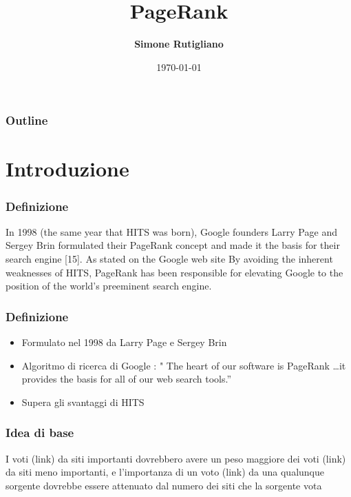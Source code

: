 \documentclass{beamer}
\title[PAGERANK]{PageRank}
\institute{
\begin{small}
Corso di Laurea in Informatica Magistrale
\end{small}}
\author{\textbf{Simone Rutigliano}}
\date{\tiny{\today}}
\begin{document}

\begin{frame}
\maketitle
\end{frame}


\begin{frame}
\frametitle{Outline}
	\tableofcontents
\end{frame}


\section{Introduzione}
\begin{frame}
\frametitle{Definizione}
In 1998 (the same year that HITS was born), Google founders Larry Page and Sergey Brin formulated
their PageRank concept and made it the basis for their search engine [15]. As stated on the Google web
site
By avoiding the inherent weaknesses of HITS, PageRank has been responsible for elevating Google to the
position of the world's preeminent search engine.
\end{frame}


\begin{frame}
	\frametitle{Definizione}
	\begin{itemize}
		\item Formulato nel 1998 da Larry Page e Sergey Brin
		\item Algoritmo di ricerca di Google : " The heart of our software is PageRank \texttrademark\dots it provides the basis for all of our web search tools.''
		\item Supera gli svantaggi di HITS
	\end{itemize}
\end{frame}


\begin{frame}
	\frametitle{Idea di base}
	I voti (link) da siti importanti dovrebbero avere un peso maggiore dei voti (link) da siti meno importanti, e l'importanza di un voto (link) da una qualunque sorgente dovrebbe essere attenuato dal numero dei siti che la sorgente vota
\end{frame}
\end{document}
